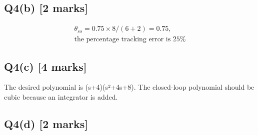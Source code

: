 \documentclass[11pt,a4paper]{article}
\begin{document}
\subsection*{Q4(b) \hfill [2 marks]}

\[\begin{aligned}\theta_{ss} = 0.75\times8/(6+2)=0.75,\\ \text{the percentage tracking error is 25\%}\end{aligned}\]

\subsection*{Q4(c) \hfill [4 marks]}

The desired polynomial is (s+4)(s²+4s+8).
The closed-loop polynomial should be cubic because an integrator is added.

\subsection*{Q4(d) \hfill [2 marks]}

\vspace{2mm}
\end{document}
